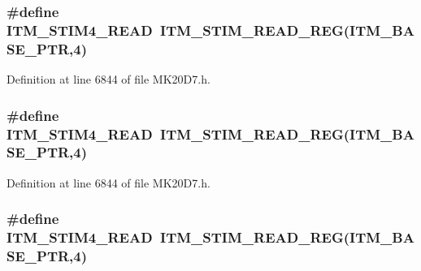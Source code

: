 \subsubsection[{\texorpdfstring{I\+T\+M\+\_\+\+S\+T\+I\+M4\+\_\+\+R\+E\+AD}{ITM_STIM4_READ}}]{\setlength{\rightskip}{0pt plus 5cm}\#define I\+T\+M\+\_\+\+S\+T\+I\+M4\+\_\+\+R\+E\+AD~{\bf I\+T\+M\+\_\+\+S\+T\+I\+M\+\_\+\+R\+E\+A\+D\+\_\+\+R\+EG}({\bf I\+T\+M\+\_\+\+B\+A\+S\+E\+\_\+\+P\+TR},4)}\hypertarget{group___i_t_m___register___accessor___macros_ga7bc9ebee3625b9f578807478ac2a35fc}{}\label{group___i_t_m___register___accessor___macros_ga7bc9ebee3625b9f578807478ac2a35fc}


Definition at line 6844 of file M\+K20\+D7.\+h.

\subsubsection[{\texorpdfstring{I\+T\+M\+\_\+\+S\+T\+I\+M4\+\_\+\+R\+E\+AD}{ITM_STIM4_READ}}]{\setlength{\rightskip}{0pt plus 5cm}\#define I\+T\+M\+\_\+\+S\+T\+I\+M4\+\_\+\+R\+E\+AD~{\bf I\+T\+M\+\_\+\+S\+T\+I\+M\+\_\+\+R\+E\+A\+D\+\_\+\+R\+EG}({\bf I\+T\+M\+\_\+\+B\+A\+S\+E\+\_\+\+P\+TR},4)}\hypertarget{group___i_t_m___register___accessor___macros_ga7bc9ebee3625b9f578807478ac2a35fc}{}\label{group___i_t_m___register___accessor___macros_ga7bc9ebee3625b9f578807478ac2a35fc}


Definition at line 6844 of file M\+K20\+D7.\+h.

\subsubsection[{\texorpdfstring{I\+T\+M\+\_\+\+S\+T\+I\+M4\+\_\+\+R\+E\+AD}{ITM_STIM4_READ}}]{\setlength{\rightskip}{0pt plus 5cm}\#define I\+T\+M\+\_\+\+S\+T\+I\+M4\+\_\+\+R\+E\+AD~{\bf I\+T\+M\+\_\+\+S\+T\+I\+M\+\_\+\+R\+E\+A\+D\+\_\+\+R\+EG}({\bf I\+T\+M\+\_\+\+B\+A\+S\+E\+\_\+\+P\+TR},4)}\hypertarget{group___i_t_m___register___accessor___macros_ga7bc9ebee3625b9f578807478ac2a35fc}{}\label{group___i_t_m___register___accessor___macros_ga7bc9ebee3625b9f578807478ac2a35fc}


